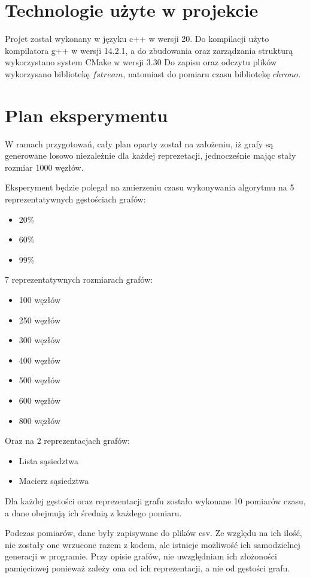 \documentclass{article}
\begin{document}
\section{Technologie użyte w projekcie}
Projet został wykonany w języku c++ w wersji 20. Do kompilacji użyto kompilatora g++ w wersji 14.2.1, 
a do zbudowania oraz zarządzania strukturą wykorzystano system CMake w wersji 3.30
Do zapisu oraz odczytu plików wykorzysano bibliotekę $fstream$, natomiast do pomiaru czasu bibliotekę $chrono$.

\section{Plan eksperymentu}

W ramach przygotowań, cały plan oparty został na założeniu, iż grafy są generowane losowo niezależnie dla każdej reprezetacji, jednocześnie mając stały rozmiar 1000 węzłów.

Eksperyment będzie polegał na zmierzeniu czasu wykonywania algorytmu na 5 reprezentatywnych gęstościach grafów:
\begin{itemize}
    \item 20\%
    \item 60\%
    \item 99\%
\end{itemize}

7 reprezentatywnych rozmiarach grafów:

\begin{itemize}
    \item 100 węzłów
    \item 250 węzłów
    \item 300 węzłów
    \item 400 węzłów
    \item 500 węzłów
    \item 600 węzłów
    \item 800 węzłów
\end{itemize}

Oraz na 2 reprezentacjach grafów:
\begin{itemize}
    \item Lista sąsiedztwa
    \item Macierz sąsiedztwa
\end{itemize}

Dla każdej gęstości oraz reprezentacji grafu zostało wykonane 10 pomiarów czasu, a dane obejmują ich średnią z każdego pomiaru.

Podczas pomiarów, dane były zapisywane do plików csv. Ze względu na ich ilość, nie zostały one wrzucone razem z kodem, ale istnieje możliwość ich samodzielnej generacji w programie.
Przy opisie grafów, nie uwzględniam ich złożoności pamięciowej ponieważ zależy ona od ich reprezentacji, a nie od gęstości grafu. 
\end{document}
